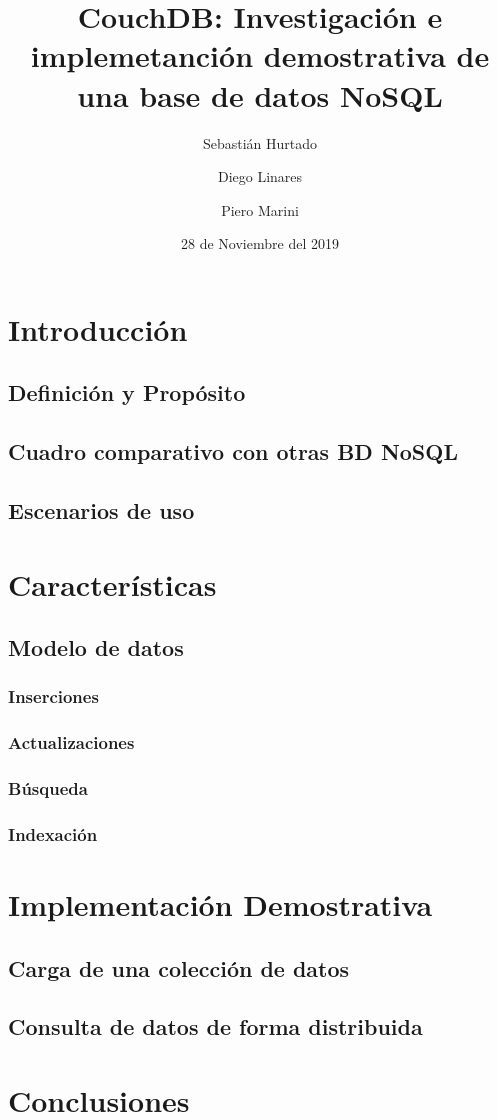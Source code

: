 \documentclass{article}
\title{CouchDB: Investigación e implemetanción demostrativa de una base de datos NoSQL}
\author{Sebastián Hurtado \and Diego Linares \and Piero Marini}
\date{28 de Noviembre del 2019}
\begin{document}
    \maketitle  
    \section{Introducción}
        \subsection{Definición y Propósito}
        \subsection{Cuadro comparativo con otras BD NoSQL}
        \subsection{Escenarios de uso}
    \section{Características}
        \subsection{Modelo de datos}
            \subsubsection{Inserciones}
            \subsubsection{Actualizaciones}
            \subsubsection{Búsqueda}
            \subsubsection{Indexación} 
    \section{Implementación Demostrativa}
        \subsection{Carga de una colección de datos}
        \subsection{Consulta de datos de forma distribuida}
    \section{Conclusiones}
\end{document}
